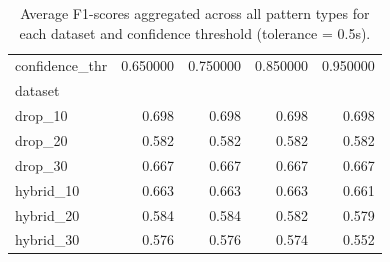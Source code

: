 \begin{table}[H]
\centering
\begin{table}
\caption{Average F1-scores aggregated across all pattern types for each dataset and confidence threshold (tolerance = 0.5s).}
\label{tab:f1_confidence_dataset_summary_t5}
\begin{tabular}{lrrrr}
\toprule
confidence_thr & 0.650000 & 0.750000 & 0.850000 & 0.950000 \\
dataset &  &  &  &  \\
\midrule
drop_10 & 0.698 & 0.698 & 0.698 & 0.698 \\
drop_20 & 0.582 & 0.582 & 0.582 & 0.582 \\
drop_30 & 0.667 & 0.667 & 0.667 & 0.667 \\
hybrid_10 & 0.663 & 0.663 & 0.663 & 0.661 \\
hybrid_20 & 0.584 & 0.584 & 0.582 & 0.579 \\
hybrid_30 & 0.576 & 0.576 & 0.574 & 0.552 \\
\bottomrule
\end{tabular}
\end{table}
\end{table}
